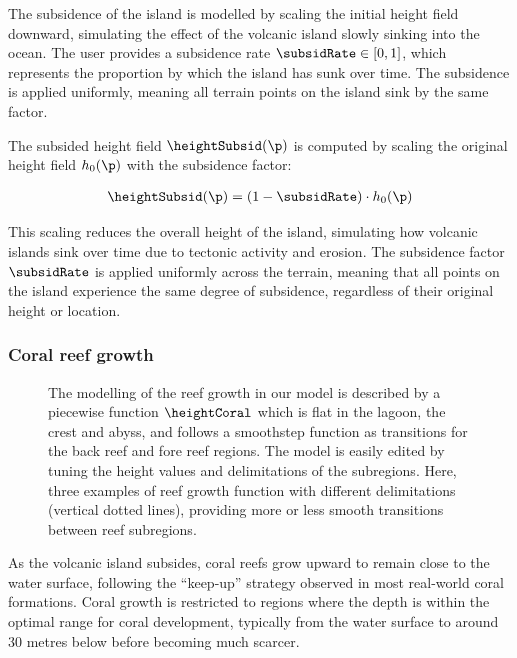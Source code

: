 The subsidence of the island is modelled by scaling the initial height field downward, simulating the effect of the volcanic island slowly sinking into the ocean. The user provides a subsidence rate $\subsidRate \in [0, 1]$, which represents the proportion by which the island has sunk over time. The subsidence is applied uniformly, meaning all terrain points on the island sink by the same factor.

The subsided height field $\heightSubsid(\p)$ is computed by scaling the original height field $h_0(\p)$ with the subsidence factor:

\begin{align}
\heightSubsid(\p) = (1 - \subsidRate) \cdot h_0(\p)
\end{align}

This scaling reduces the overall height of the island, simulating how volcanic islands sink over time due to tectonic activity and erosion. The subsidence factor $\subsidRate$ is applied uniformly across the terrain, meaning that all points on the island experience the same degree of subsidence, regardless of their original height or location.

\subsubsection{Coral reef growth}
\label{sec:coral-island-reef-growth}

\begin{figure}[H]
\caption{The modelling of the reef growth in our model is described by a piecewise function $\heightCoral$ which is flat in the lagoon, the crest and abyss, and follows a smoothstep function as transitions for the back reef and fore reef regions. The model is easily edited by tuning the height values and delimitations of the subregions. Here, three examples of reef growth function with different delimitations (vertical dotted lines), providing more or less smooth transitions between reef subregions.}
\label{fig:coral-island-reef-function}
\end{figure}

As the volcanic island subsides, coral reefs grow upward to remain close to the water surface, following the “keep-up” strategy observed in most real-world coral formations. Coral growth is restricted to regions where the depth is within the optimal range for coral development, typically from the water surface to around 30 metres below before becoming much scarcer.

